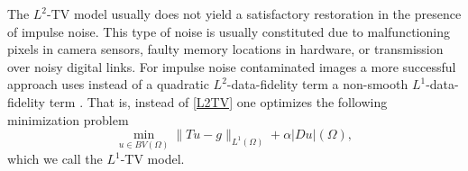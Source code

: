 \documentclass[enabledeprecatedfontcommands,cleardoublepage=empty,headsepline,twoside,11pt,DIV=15,BCOR=12mm,final]{scrartcl}
\begin{document}
The $L^2$-TV model usually does not yield a satisfactory restoration in the presence of impulse noise. This type of noise is usually constituted due to malfunctioning pixels in camera sensors, faulty memory locations in hardware, or transmission over noisy digital links. 
For impulse noise contaminated images a more successful approach uses instead of a quadratic $L^2$-data-fidelity term a non-smooth $L^1$-data-fidelity term \cite{All, Nik2002, Nik2004}. That is, instead of \eqref{L2TV} one optimizes the following minimization problem
\begin{equation}\label{L1TV}
\min_{u\in BV(\Omega)} \|Tu-g\|_{L^1(\Omega)} + \alpha |Du|(\Omega),
\end{equation}
which we call the $L^1$-TV model. 
\end{document}
